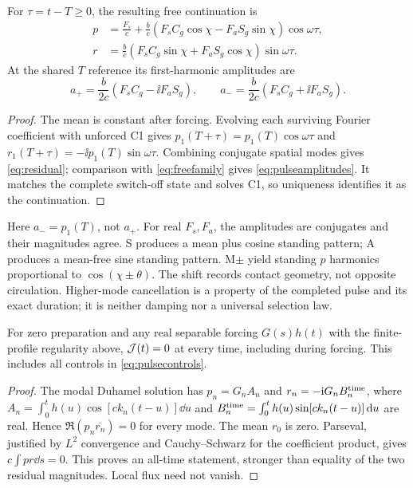 \begin{corollary}\label{cor:standing}
For $\tau=t-T\ge0$, the resulting free continuation is
\begin{equation}\label{eq:residual}
 \begin{aligned}
 p&=\frac{F_s}{c}+\frac bc(F_sC_g\cos\chi-F_aS_g\sin\chi)\cos\omega\tau,\\
 r&=\frac bc(F_sC_g\sin\chi+F_aS_g\cos\chi)\sin\omega\tau.
 \end{aligned}
\end{equation}
At the shared $T$ reference its first-harmonic amplitudes are
\begin{equation}\label{eq:pulseamplitudes}
 a_+=\frac b{2c}(F_sC_g-\ii F_aS_g),\qquad
 a_-=\frac b{2c}(F_sC_g+\ii F_aS_g).
\end{equation}
\end{corollary}
\begin{proof}
The mean is constant after forcing. Evolving each surviving Fourier coefficient with unforced C1 gives $p_1(T+\tau)=p_1(T)\cos\omega\tau$ and $r_1(T+\tau)=-\ii p_1(T)\sin\omega\tau$. Combining conjugate spatial modes gives \eqref{eq:residual}; comparison with \eqref{eq:freefamily} gives \eqref{eq:pulseamplitudes}. It matches the complete switch-off state and solves C1, so uniqueness identifies it as the continuation.
\end{proof}

Here $a_-=p_1(T)$, not $a_+$. For real $F_s,F_a$, the amplitudes are conjugates and their magnitudes agree. S produces a mean plus cosine standing pattern; A produces a mean-free sine standing pattern. M$\pm$ yield standing $p$ harmonics proportional to $\cos(\chi\pm\theta)$. The shift records contact geometry, not opposite circulation. Higher-mode cancellation is a property of the completed pulse and its exact duration; it is neither damping nor a universal selection law.

\begin{theorem}\label{thm:commonzero}
For zero preparation and any real separable forcing $G(s)h(t)$ with the finite-profile regularity above, $\mathcal J(t)=0$ at every time, including during forcing. This includes all controls in \eqref{eq:pulsecontrols}.
\end{theorem}
\begin{proof}
The modal Duhamel solution has $p_n=G_n A_n$ and $r_n=-\mathrm i G_n B_n^{\rm time}$, where $A_n=\int_0^t h(u)\cos[ck_n(t-u)]\dd u$ and $B_n^{\rm time}=\int_0^t h(u)\sin[ck_n(t-u)]\,\mathrm d u$ are real. Hence $\Re(p_n\overline{r_n})=0$ for every mode. The mean $r_0$ is zero. Parseval, justified by $L^2$ convergence and Cauchy--Schwarz for the coefficient product, gives $c\int pr\dd s=0$. This proves an all-time statement, stronger than equality of the two residual magnitudes. Local flux need not vanish.
\end{proof}

